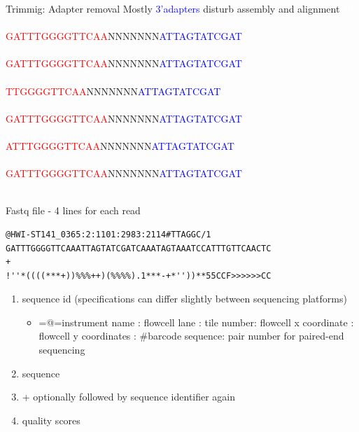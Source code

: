\documentclass[presentation]{beamer}
\begin{document}
\begin{frame}[label=sec-2-1-3]{Trimmig: Adapter removal}
Mostly \textcolor{blue}{3'adapters} disturb assembly and alignment
\textcolor{white}{dd}\\
\textcolor{white}{dd}\\
\textcolor{red}{GATTTGGGGTTCAA}NNNNNNN\textcolor{blue}{ATTAGTATCGAT}\\
\textcolor{white}{}\\
\textcolor{red}{GATTTGGGGTTCAA}NNNNNNN\textcolor{blue}{ATTAGTATCGAT}\\
\textcolor{white}{}\\
\textcolor{red}{TTGGGGTTCAA}NNNNNNN\textcolor{blue}{ATTAGTATCGAT}\\
\textcolor{white}{}\\
\textcolor{red}{GATTTGGGGTTCAA}NNNNNNN\textcolor{blue}{ATTAGTATCGAT}\\
\textcolor{white}{}\\
\textcolor{red}{ATTTGGGGTTCAA}NNNNNNN\textcolor{blue}{ATTAGTATCGAT}\\
\textcolor{white}{}\\
\textcolor{red}{GATTTGGGGTTCAA}NNNNNNN\textcolor{blue}{ATTAGTATCGAT}\\
\textcolor{white}{}\\
\end{frame}



\begin{frame}[fragile,label=sec-2-1-4]{Fastq file - 4 lines for each read}
 \begin{verbatim}
@HWI-ST141_0365:2:1101:2983:2114#TTAGGC/1
GATTTGGGGTTCAAATTAGTATCGATCAAATAGTAAATCCATTTGTTCAACTC
+
!''*((((***+))%%%++)(%%%%).1***-+*''))**55CCF>>>>>>CC
\end{verbatim}

\begin{enumerate}
\item sequence id (specifications can differ slightly between sequencing platforms)
\begin{itemize}
\item =@=instrument name : flowcell lane : tile number: flowcell x coordinate : flowcell y coordinates : \#barcode sequence: pair number for paired-end sequencing
\end{itemize}
\item sequence
\item + optionally followed by sequence identifier again
\item quality scores
\end{enumerate}
\end{frame}
\end{document}

